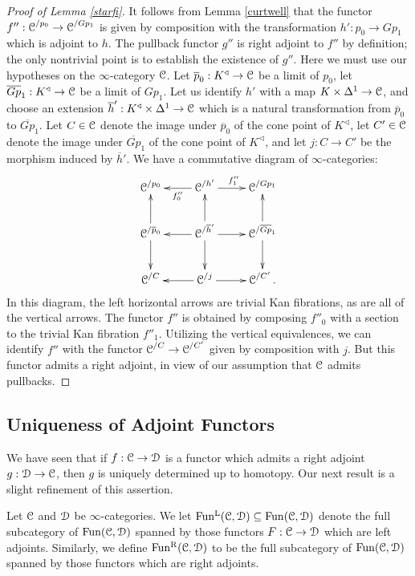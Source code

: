 \begin{proof}[Proof of Lemma \ref{starfi}]
It follows from Lemma \ref{curtwell} that the functor $f'': \operatorname{\mathcal{C}}^{/p_0}
\rightarrow \operatorname{\mathcal{C}}^{/Gp_1}$ is given by composition with the transformation
$h': p_0 \rightarrow Gp_1$ which is adjoint to $h$.
The pullback functor 
$g''$ 
is right adjoint to $f''$ by definition; the only nontrivial point is to 
establish the existence of $g''$. Here we must use our hypotheses on the 
$\infty$-category $\operatorname{\mathcal{C}}$. Let $\overline{p}_0: K^{\triangleleft} 
\rightarrow \operatorname{\mathcal{C}}$ be a limit of $p_0$, let $\overline{Gp}_1: 
K^{\triangleleft} \rightarrow \operatorname{\mathcal{C}}$ be a limit of $Gp_1$. Let us identify 
$h'$ with a map $K \times \Delta^1 \rightarrow \operatorname{\mathcal{C}}$, and choose an 
extension $\overline{h}': K^{\triangleleft} \times \Delta^1 \rightarrow 
\operatorname{\mathcal{C}}$ which is a natural transformation from $\overline{p}_0$ to
$\overline{Gp}_1$. Let $C \in \operatorname{\mathcal{C}}$ denote the image under
$\overline{p}_0$ of the cone point of $K^{\triangleleft}$, let
$C' \in \operatorname{\mathcal{C}}$ denote the image under $\overline{Gp}_1$ of the cone point
of $K^{\triangleleft}$, and let $j: C \rightarrow C'$ be the morphism
induced by $\overline{h}'$. We have a commutative diagram of 
$\infty$-categories:
$$ \xymatrix{ \calC^{/ p_0} & \calC^{ / h' } \ar[r]^{f''_1} \ar[l]^{f''_0} 
& \calC^{/ 
Gp_1} \\
\calC^{/ \overline{p}_0 } \ar[u] \ar[d] & \calC^{/ \overline{h}'} \ar[l] 
\ar[r] \ar[u] \ar[d] & \calC^{/ \overline{Gp}_1} \ar[u] \ar[d] \\
\calC^{/C} & \calC^{/ j} \ar[r] \ar[l] & \calC^{ /C '}. } $$
In this diagram, the left horizontal arrows are trivial Kan fibrations, as 
are all of the vertical arrows. The functor $f''$ is obtained by composing
$f''_0$ with a section to the trivial Kan fibration $f''_1$. Utilizing
the vertical equivalences, we can identify $f''$ with the functor
$\operatorname{\mathcal{C}}^{/C} \rightarrow \operatorname{\mathcal{C}}^{/C'}$ given by composition with $j$.
But this functor admits a right adjoint, in view of our assumption that
$\operatorname{\mathcal{C}}$ admits pullbacks.
\end{proof}

\subsection{Uniqueness of Adjoint Functors}\label{afunc5}

We have seen that if $f: \operatorname{\mathcal{C}} \rightarrow \operatorname{\mathcal{D}}$ is a functor which admits a right adjoint
$g: \operatorname{\mathcal{D}} \rightarrow \operatorname{\mathcal{C}}$, then $g$ is uniquely determined up to homotopy. Our next result is a slight refinement of this assertion. 

\begin{definition}
Let $\operatorname{\mathcal{C}}$ and $\operatorname{\mathcal{D}}$ be $\infty$-categories. We let $\operatorname{Fun^{L}}(\operatorname{\mathcal{C}}, \operatorname{\mathcal{D}})
\subseteq \operatorname{Fun}(\operatorname{\mathcal{C}}, \operatorname{\mathcal{D}})$ denote the full subcategory of $\operatorname{Fun}(\operatorname{\mathcal{C}},\operatorname{\mathcal{D}})$ spanned by those functors $F: \operatorname{\mathcal{C}} \rightarrow \operatorname{\mathcal{D}}$ which are left adjoints. Similarly, we define
$\operatorname{Fun^{R}}(\operatorname{\mathcal{C}},\operatorname{\mathcal{D}})$ to be the full subcategory of $\operatorname{Fun}(\operatorname{\mathcal{C}}, \operatorname{\mathcal{D}})$ spanned by those functors which are right adjoints.
\end{definition}

